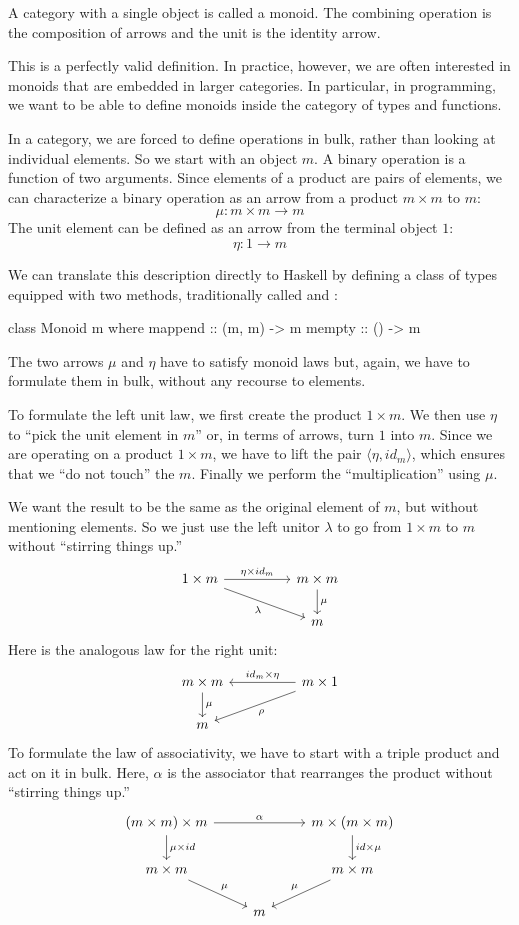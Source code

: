 \documentclass[DaoFP]{subfiles}
\begin{document}
A category with a single object is called a monoid. The combining operation is the composition of arrows and the unit is the identity arrow. 

This is a perfectly valid definition. In practice, however, we are often interested in monoids that are embedded in larger categories. In particular, in programming, we want to be able to define monoids inside the category of types and functions. 

In a category, we are forced to define operations in bulk, rather than looking at individual elements. So we start with an object $m$. A binary operation is a function of two arguments. Since elements of a product are pairs of elements, we can characterize a binary operation as an arrow from a product $m \times m$ to $m$:
\[ \mu \colon m \times m \to m \]
The unit element can be defined as an arrow from the terminal object $1$:
\[ \eta \colon 1 \to m \]

We can translate this description directly to Haskell by defining a class of types equipped with two methods, traditionally called  and :
\begin{haskell}
class Monoid m where
  mappend :: (m, m) -> m
  mempty  :: () -> m
\end{haskell}

The two arrows $\mu$ and $\eta$ have to satisfy monoid laws but, again, we have to formulate them in bulk, without any recourse to elements.

To formulate the left unit law, we first create the product $1 \times m$. We then use $\eta$ to ``pick the unit element in $m$'' or, in terms of arrows, turn $1$ into $m$. Since we are operating on a product $1 \times m$, we have to lift the pair $\langle \eta, id_m \rangle$, which ensures that we ``do not touch'' the $m$. Finally we perform the ``multiplication'' using $\mu$. 

We want the result to be the same as the original element of $m$, but without mentioning elements. So we just use the left unitor $\lambda$ to go from $1 \times m$ to $m$ without ``stirring things up.''
\[
 \begin{tikzcd}
 1 \times m
 \arrow[rr, "\eta \times id_m"]
 \arrow[rrd, "\lambda"']
& & m \times m
 \arrow[d, "\mu"]
 \\
 && m
  \end{tikzcd}
\]
Here is the analogous law for the right unit:
\[
 \begin{tikzcd}
 m \times m
 \arrow[d, "\mu"]
 && m \times 1
 \arrow[ll, "id_m \times \eta"']
 \arrow[lld, "\rho"]
 \\
 m
 \end{tikzcd}
\]
To formulate the law of associativity, we have to start with a triple product and act on it in bulk. Here, $\alpha$ is the associator that rearranges the product without ``stirring things up.''
\[
 \begin{tikzcd}
 (m \times m) \times m 
 \arrow[rr, "\alpha"]
 \arrow[d, "\mu \times id"]
 &&
 m \times (m \times m)
 \arrow[d, "id \times \mu"]
 \\
 m \times m 
 \arrow[dr, "\mu"]
& & m \times m
 \arrow[dl, "\mu"']
 \\
&  m
 \end{tikzcd}
\]
\end{document}
